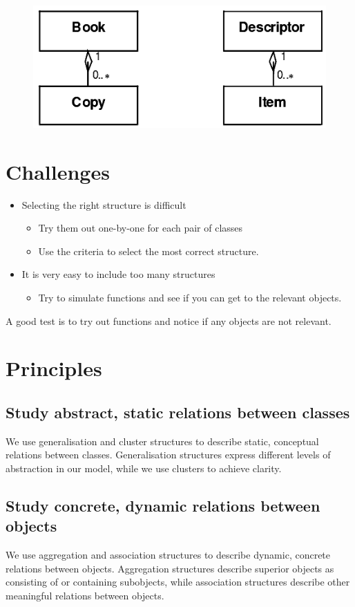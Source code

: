 \begin{figure}[H]
    \centering
    \includegraphics[width=.4\textwidth]{figures/itemdescriptorpattern.png}
\end{figure}

\section{Challenges}
\begin{itemize}
    \item Selecting the right structure is difficult
    \begin{itemize}
        \item Try them out one-by-one for each pair of classes
        \item Use the criteria to select the most correct structure.
    \end{itemize}
    \item It is very easy to include too many structures
    \begin{itemize}
        \item Try to simulate functions and see if you can get to the relevant objects.
    \end{itemize}
\end{itemize}

\noindent A good test is to try out functions and notice if any objects are not relevant.

\section{Principles}
\subsection{Study abstract, static relations between classes}
We use generalisation and cluster structures to describe static, conceptual relations between classes. Generalisation structures express different levels of abstraction in our model, while we use clusters to achieve clarity.

\subsection{Study concrete, dynamic relations between objects}
We use aggregation and association structures to describe dynamic, concrete relations between objects. Aggregation structures describe superior objects as consisting of or containing subobjects, while association structures describe other meaningful relations between objects.

